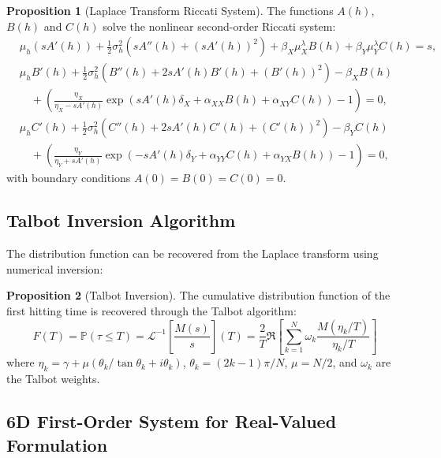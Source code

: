 \documentclass{article}
\renewcommand{\P}{\mathbb{P}}
\theoremstyle{definition}
\newtheorem{proposition}{Proposition}[section]
\begin{document}
\begin{proposition}[Laplace Transform Riccati System]
\label{prop:laplace_riccati}
The functions $A(h)$, $B(h)$ and $C(h)$ solve the nonlinear second-order Riccati system:
\[
\begin{aligned}
& \mu_h (s A'(h)) 
+ \frac{1}{2}\sigma_h^2 \left( s A''(h) + (s A'(h))^2 \right)
+ \beta_X \mu_X^\lambda B(h) 
+ \beta_Y \mu_Y^\lambda C(h) 
= s, \\[1.2ex]
& \mu_h B'(h) 
+ \frac{1}{2}\sigma_h^2 \left( B''(h) + 2 s A'(h) B'(h) + (B'(h))^2 \right)
- \beta_X B(h) \\
&\quad + \left( \frac{\eta_X}{\eta_X - s A'(h)} 
\exp\!\left( s A'(h)\delta_X + \alpha_{XX} B(h) + \alpha_{XY} C(h) \right) - 1 \right) 
= 0, \\[1.2ex]
& \mu_h C'(h) 
+ \frac{1}{2}\sigma_h^2 \left( C''(h) + 2 s A'(h) C'(h) + (C'(h))^2 \right)
- \beta_Y C(h) \\
&\quad + \left( \frac{\eta_Y}{\eta_Y + s A'(h)} 
\exp\!\left( -s A'(h)\delta_Y + \alpha_{YY} C(h) + \alpha_{YX} B(h) \right) - 1 \right) 
= 0,
\end{aligned}
\]
with boundary conditions $A(0) = B(0) = C(0) = 0$.
\end{proposition}

\subsection{Talbot Inversion Algorithm}

The distribution function can be recovered from the Laplace transform using numerical inversion:
\begin{proposition}[Talbot Inversion]
\label{prop:talbot}
The cumulative distribution function of the first hitting time is recovered through the Talbot algorithm:
\begin{equation}
F(T) = \P(\tau \leq T) = \mathcal{L}^{-1}\left[\frac{M(s)}{s}\right](T) = \frac{2}{T} \Re\left[\sum_{k=1}^{N} \omega_k \frac{M(\eta_k/T)}{\eta_k/T}\right]
\end{equation}
where $\eta_k = \gamma + \mu(\theta_k/\tan\theta_k + i\theta_k)$, $\theta_k = (2k-1)\pi/N$, $\mu = N/2$, and $\omega_k$ are the Talbot weights.
\end{proposition}

\subsection{6D First-Order System for Real-Valued Formulation}
\end{document}
